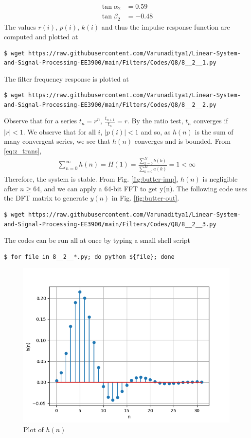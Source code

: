 \documentclass[journal,12pt,twocolumn]{IEEEtran}
\renewcommand\thesection{\arabic{section}}
\begin{document}
\begin{enumerate}[label=\thesection.\arabic*.,ref=\thesection.\theenumi]
\begin{align}
	\tan{\alpha_2} &= 0.59 \\
	\tan{\beta_2} &= -0.48
	\label{eq:h-params}
\end{align}
The values $r(i)$, $p(i)$, $k(i)$ and thus the impulse response function are computed and plotted at
\begin{lstlisting}
$ wget https://raw.githubusercontent.com/Varunaditya1/Linear-System-and-Signal-Processing-EE3900/main/Filters/Codes/Q8/8__2__1.py
\end{lstlisting}
The filter frequency response is plotted at
\begin{lstlisting}
$ wget https://raw.githubusercontent.com/Varunaditya1/Linear-System-and-Signal-Processing-EE3900/main/Filters/Codes/Q8/8__2__2.py
\end{lstlisting}
Observe that for a series $t_n = r^n$, $\frac{t_{n + 1}}{t_n} = r$.
By the ratio test, $t_n$ converges if $|r| < 1$. We observe that for all $i$, 
$|p(i)| < 1$ and so, as $h(n)$ is the sum of many convergent series,
we see that $h(n)$ converges and is bounded. From \eqref{eq:z_trans},
\begin{align}
	\sum_{n = 0}^{\infty}h(n) = H(1) = \frac{\sum_{k = 0}^{N}b(k)}{\sum_{k = 0}^{M}a(k)} = 1 < \infty
\end{align}
Therefore, the system is stable. From
Fig. \eqref{fig:butter-imp}, $h(n)$ is negligible after $n \geq 64$, and we
can apply a 64-bit FFT to get y(n). The following code uses the DFT matrix
to generate $y(n)$ in Fig. \eqref{fig:butter-out}.
\begin{lstlisting}
$ wget https://raw.githubusercontent.com/Varunaditya1/Linear-System-and-Signal-Processing-EE3900/main/Filters/Codes/Q8/8__2__3.py
\end{lstlisting}
The codes can be run all at once by typing a small shell script
\begin{lstlisting}
$ for file in 8__2__*.py; do python ${file}; done
\end{lstlisting}

\begin{figure}[!htb]
	\includegraphics[width=\columnwidth]{Figures/Q8/8__2__1.png}
	\caption{Plot of $h(n)$}
	\label{fig:butter-imp}
\end{figure}


\end{enumerate}
\end{document}
